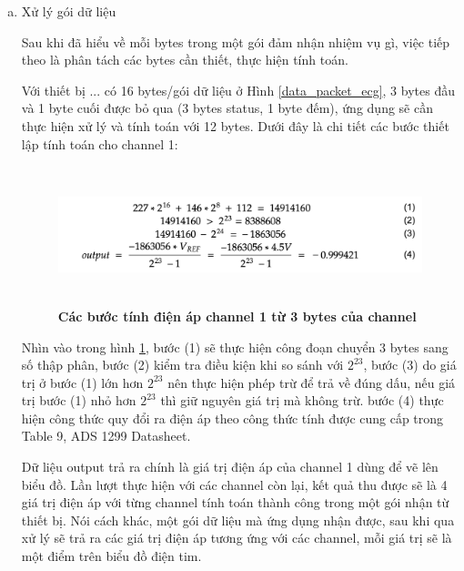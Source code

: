 \begin{enumerate} [a)]


  \item Xử lý gói dữ liệu

    Sau khi đã hiểu về mỗi bytes trong một gói đảm nhận nhiệm vụ gì, việc tiếp theo là phân tách các bytes cần thiết,
    thực hiện tính toán. 
    
    Với thiết bị ... có 16 bytes/gói dữ liệu ở Hình \ref{data_packet_ecg}, 3 bytes đầu và 1 byte cuối được bỏ qua (3 bytes status, 
    1 byte đếm), ứng dụng sẽ cần thực hiện xử lý và tính toán với 12 bytes. Dưới đây là chi tiết các bước thiết lập tính toán cho channel 1: 

    \begin{figure}[H]
      \centering
      \includegraphics[width=16cm,height=4cm]{Images/mobile_app/ecg_calculation/handle_one_channel.png}
      \caption[Các bước tính điện áp channel 1 từ 3 bytes của channel]{\bfseries \fontsize{12pt}{0pt}
      \selectfont Các bước tính điện áp channel 1 từ 3 bytes của channel}
      \label{channel_01_calculation} %
    \end{figure}

    Nhìn vào trong hình \ref{channel_01_calculation}, bước (1) sẽ thực hiện công đoạn chuyển 3 bytes sang số thập phân,
    bước (2) kiểm tra điều kiện khi so sánh với \(2^{23}\), bước (3) do giá trị ở bước (1) lớn hơn \(2^{23}\) nên thực hiện
    phép trừ để trả về đúng dấu, nếu giá trị bước (1) nhỏ hơn \(2^{23}\) thì giữ nguyên giá trị mà không trừ.
    bước (4) thực hiện công thức quy đổi ra điện áp theo công thức tính được cung cấp trong Table 9, ADS 1299
    Datasheet.

    Dữ liệu output trả ra chính là giá trị điện áp của channel 1 dùng để vẽ lên biểu đồ. Lần lượt thực hiện với các channel
    còn lại, kết quả thu được sẽ là 4 giá trị điện áp với từng channel tính toán thành công trong một gói nhận từ thiết bị.
    Nói cách khác, một gói dữ liệu mà ứng dụng nhận được, sau khi qua xử lý sẽ trả ra các giá trị điện áp tương ứng với các
    channel, mỗi giá trị sẽ là một điểm trên biểu đồ điện tim.


\end{enumerate}
